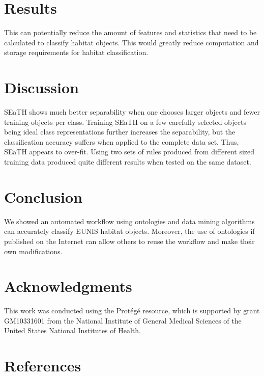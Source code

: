 \documentclass[authoryear, review,12pt,number]{elsarticle}
\begin{document}
\section{Results}
This can potentially reduce the amount of features
and statistics that need to be calculated to classify habitat objects. This
would greatly reduce computation and storage requirements for habitat
classification.
\section{Discussion}
SEaTH shows much better separability when one chooses larger objects and fewer
training objects per class. Training SEaTH on a few carefully selected objects
being ideal class representations further increases the separability, but the 
classification
accuracy suffers when applied to the complete data set. Thus, SEaTH appears to
over-fit. Using two sets of rules produced from different sized training data
produced quite different results when tested on the same dataset.
\section{Conclusion}
We showed an automated workflow using ontologies and data mining algorithms can
accurately classify EUNIS habitat objects. Moreover, the use of ontologies if
published on the Internet can allow others to reuse the workflow and make their own
modifications.
\section{Acknowledgments}
This work was conducted using the Prot\'eg\'e resource, which
is supported by grant GM10331601 from the National Institute of General
Medical Sciences of the United States National Institutes of Health.

\section{References}

\end{document}
